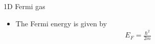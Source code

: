 \documentclass{beamer}
\begin{document}
\begin{frame}{1D Fermi gas}
\begin{itemize}
\item The Fermi energy is given by
\begin{align}
E_F = \frac{\hbar^2}{2 m}
\end{align}

\end{itemize}
\end{frame}


\end{document}
